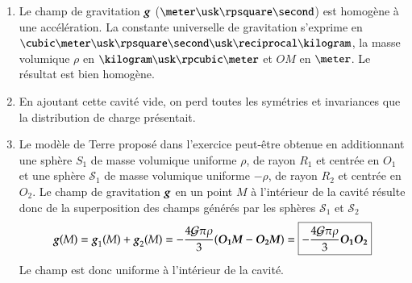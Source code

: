 \begin{corrige}
\begin{enumerate}
\item Le champ de gravitation $\vecg$ ($\meter \usk \rpsquare \second$)
      est homogène à une accélération.
      La constante universelle de gravitation s'exprime en $
      \cubic \meter \usk \rpsquare \second \usk \reciprocal \kilogram$, la masse volumique
      $\rho$ en $\kilogram \usk \rpcubic \meter$ et $OM$ en $\meter$. Le résultat
      est bien homogène.

      \item En ajoutant cette cavité vide, on perd toutes les symétries et invariances
	    que la distribution de charge présentait. 

      \item Le modèle de Terre proposé dans l'exercice peut-être obtenue en 
	    additionnant une sphère $S_1$ de masse volumique uniforme $\rho$, de rayon
	    $R_1$ et centrée en $O_1$ et une sphère $\mathcal{S}_1$ de masse volumique
	    uniforme $-\rho$, de rayon $R_2$ et centrée en $O_2$. Le champ de 
	    gravitation $\vecg$ en un point $M$ à l'intérieur de la cavité résulte donc
	    de la superposition des champs générés par les sphères $\mathcal{S}_1$
	    et $\mathcal{S}_2$
	    \begin{equation*}
		    \vecg(M) = \vecg_1(M) + \vecg_2(M) = 
	    -\dfrac{4 \mathcal{G} \pi \rho}{3} (\mitbf{O_1M} - \mitbf{O_2M}) =
	    \boxed{-\dfrac{4 \mathcal{G} \pi \rho}{3} \mitbf{O_1 O_2}}
	    \end{equation*}
	    Le champ est donc uniforme à l'intérieur de la cavité.
	\end{enumerate}
\end{corrige}

